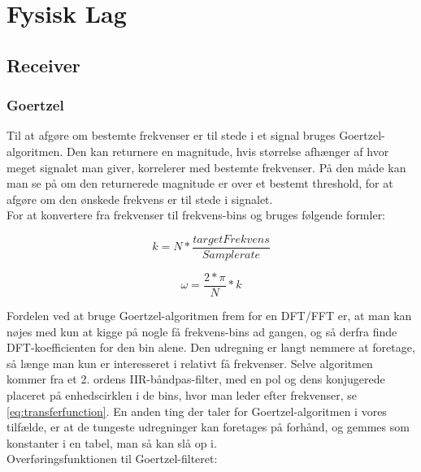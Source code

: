 \section{Fysisk Lag}

\subsection{Receiver}

\subsubsection{Goertzel}

Til at afgøre om bestemte frekvenser er til stede i et signal bruges Goertzel-algoritmen. Den kan returnere en magnitude, hvis størrelse afhænger af hvor meget signalet man giver, korrelerer med bestemte frekvenser. På den måde kan man se på om den returnerede magnitude er over et bestemt threshold, for at afgøre om den ønskede frekvens er til stede i signalet.\\

For at konvertere fra frekvenser til frekvens-bins og  bruges følgende formler:

\noindent\begin{minipage}{.5\linewidth}
\begin{equation}
  k=N*\dfrac{targetFrekvens}{Samplerate}
\end{equation}
\end{minipage}%
\begin{minipage}{.5\linewidth}
\begin{equation}
  \omega = \dfrac{2*\pi}{N}*k
\end{equation}
\end{minipage}


Fordelen ved at bruge Goertzel-algoritmen frem for en DFT/FFT er, at man kan nøjes med kun at kigge på nogle få frekvens-bins ad gangen, og så derfra finde DFT-koefficienten for den bin alene. Den udregning er langt nemmere at foretage, så længe man kun er interesseret i relativt få frekvenser. Selve algoritmen kommer fra et 2. ordens IIR-båndpas-filter, med en pol og dens konjugerede placeret på enhedscirklen i de bins, hvor man leder efter frekvenser, se \eqref{eq:transferfunction}. En anden ting der taler for Goertzel-algoritmen i vores tilfælde, er at de tungeste udregninger kan foretages på forhånd, og gemmes som konstanter i en tabel, man så kan slå op i. \\
Overføringsfunktionen til Goertzel-filteret:




